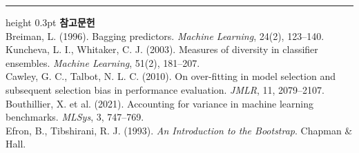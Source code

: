 \documentclass[10pt]{article}
\begin{document}
\vspace{0.6em}
\hrule height 0.3pt
\vspace{0.5em}
{\footnotesize
\textbf{참고문헌}\\[0.3em]
Breiman, L. (1996). Bagging predictors. \emph{Machine Learning}, 24(2), 123--140.\\[0.15em]
Kuncheva, L. I., Whitaker, C. J. (2003). Measures of diversity in classifier
ensembles. \emph{Machine Learning}, 51(2), 181--207.\\[0.15em]
Cawley, G. C., Talbot, N. L. C. (2010). On over-fitting in model selection and
subsequent selection bias in performance evaluation. \emph{JMLR}, 11, 2079--2107.\\[0.15em]
Bouthillier, X. et al. (2021). Accounting for variance in machine learning
benchmarks. \emph{MLSys}, 3, 747--769.\\[0.15em]
Efron, B., Tibshirani, R. J. (1993). \emph{An Introduction to the Bootstrap}.
Chapman \& Hall.
}
\end{document}
